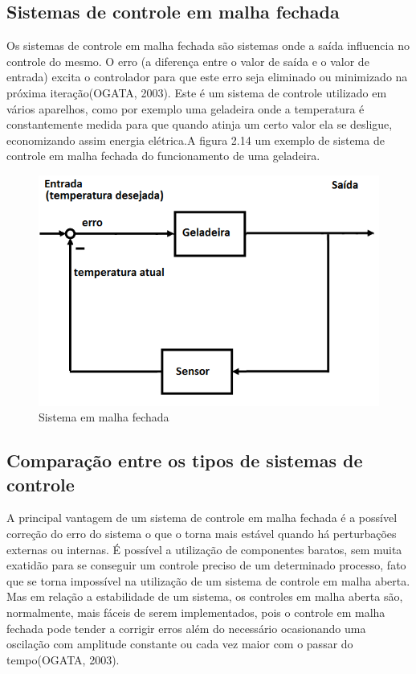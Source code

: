 \subsection{Sistemas de controle em malha fechada}

Os sistemas de controle em malha fechada são sistemas onde a saída influencia no controle do mesmo. O erro (a diferença entre o valor de saída e o valor de entrada) excita o controlador para que este erro seja eliminado ou minimizado na próxima iteração(OGATA, 2003). Este é um sistema de controle utilizado em vários aparelhos, como por exemplo uma geladeira onde a temperatura é constantemente medida para que quando atinja um certo valor ela se desligue, economizando assim energia elétrica.A figura 2.14 um exemplo de sistema de controle em malha fechada do funcionamento de uma geladeira.

\begin{figure}[H]

\center

\includegraphics[width=12cm]{imagens/malha_fechada.png}

\label{Sistema em malha fechada}

\caption{Sistema em malha fechada}

\end{figure}


\subsection{Comparação entre os tipos de sistemas de controle}

A principal vantagem de um sistema de controle em malha fechada é a possível correção do erro do sistema o que o torna mais estável quando há perturbações externas ou internas. É possível a utilização de componentes baratos, sem muita exatidão para se conseguir um controle preciso de um determinado processo, fato que se torna impossível na utilização de um sistema de controle em malha aberta. Mas em relação a estabilidade de um sistema, os controles em malha aberta são, normalmente, mais fáceis de serem implementados, pois o controle em malha fechada pode tender a corrigir erros além do necessário ocasionando uma oscilação com amplitude constante ou cada vez maior com o passar do tempo(OGATA, 2003).

